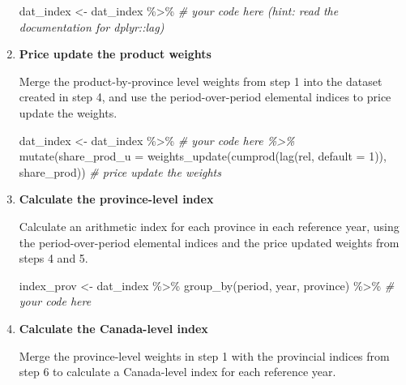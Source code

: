 \documentclass[
]{article}
\newenvironment{Shaded}{\begin{snugshade}}{\end{snugshade}}
\newcommand{\AttributeTok}[1]{\textcolor[rgb]{0.77,0.63,0.00}{#1}}
\newcommand{\CommentTok}[1]{\textcolor[rgb]{0.56,0.35,0.01}{\textit{#1}}}
\newcommand{\DecValTok}[1]{\textcolor[rgb]{0.00,0.00,0.81}{#1}}
\newcommand{\FunctionTok}[1]{\textcolor[rgb]{0.00,0.00,0.00}{#1}}
\newcommand{\NormalTok}[1]{#1}
\newcommand{\OtherTok}[1]{\textcolor[rgb]{0.56,0.35,0.01}{#1}}
\newcommand{\SpecialCharTok}[1]{\textcolor[rgb]{0.00,0.00,0.00}{#1}}
\begin{document}
\begin{enumerate}
\begin{Shaded}
\begin{Highlighting}[]
\NormalTok{dat\_index }\OtherTok{\textless{}{-}}\NormalTok{ dat\_index }\SpecialCharTok{\%\textgreater{}\%}  
  \CommentTok{\# your code here (hint: read the documentation for dplyr::lag)}
\end{Highlighting}
\end{Shaded}
\item
  \textbf{Price update the product weights}

  Merge the product-by-province level weights from step 1 into the dataset created in step 4, and use the period-over-period elemental indices to price update the weights.

\begin{Shaded}
\begin{Highlighting}[]
\NormalTok{dat\_index }\OtherTok{\textless{}{-}}\NormalTok{ dat\_index }\SpecialCharTok{\%\textgreater{}\%}  
  \CommentTok{\# your code here \%\textgreater{}\%}
  \FunctionTok{mutate}\NormalTok{(}\AttributeTok{share\_prod\_u =} \FunctionTok{weights\_update}\NormalTok{(}\FunctionTok{cumprod}\NormalTok{(}\FunctionTok{lag}\NormalTok{(rel, }\AttributeTok{default =} \DecValTok{1}\NormalTok{)), share\_prod)) }\CommentTok{\# price update the weights}
\end{Highlighting}
\end{Shaded}
\item
  \textbf{Calculate the province-level index}

  Calculate an arithmetic index for each province in each reference year, using the period-over-period elemental indices and the price updated weights from steps 4 and 5.

\begin{Shaded}
\begin{Highlighting}[]
\NormalTok{index\_prov }\OtherTok{\textless{}{-}}\NormalTok{ dat\_index }\SpecialCharTok{\%\textgreater{}\%}
  \FunctionTok{group\_by}\NormalTok{(period, year, province) }\SpecialCharTok{\%\textgreater{}\%}
  \CommentTok{\# your code here}
\end{Highlighting}
\end{Shaded}
\item
  \textbf{Calculate the Canada-level index}

  Merge the province-level weights in step 1 with the provincial indices from step 6 to calculate a Canada-level index for each reference year.


\end{enumerate}
\end{document}
